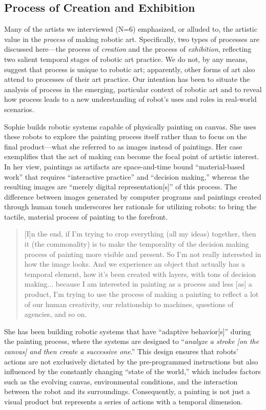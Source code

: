 \subsection{Process of Creation and Exhibition}

Many of the artists we interviewed (N=6) emphasized, or alluded to, the artistic value in the \textit{process} of making robotic art. Specifically, two types of processes are discussed here---the process of \textit{creation} and the process of \textit{exhibition}, reflecting two salient temporal stages of robotic art practice. We do not, by any means, suggest that process is unique to robotic art; apparently, other forms of art also attend to processes of their art practice. Our intention has been to situate the analysis of process in the emerging, particular context of robotic art and to reveal how process leads to a new understanding of robot's uses and roles in real-world scenarios.

Sophie builds robotic systems capable of physically painting on canvas. She uses these robots to explore the painting process itself rather than to focus on the final product—what she referred to as images instead of paintings. Her case exemplifies that the act of making can become the focal point of artistic interest. In her view, paintings as artifacts are space-and-time bound ``material-based work'' that requires ``interactive practice'' and ``decision making,'' whereas the resulting images are ``merely digital representation[s]'' of this process. The difference between images generated by computer programs and paintings created through human touch underscores her rationale for utilizing robots: to bring the tactile, material process of painting to the forefront.

\begin{quote}
   [I]n the end, if I'm trying to crop everything (all my ideas) together, then it (the commonality) is to make the temporality of the decision making process of painting more visible and present. So I'm not really interested in how the image looks. And we experience an object that actually has a temporal element, how it's been created with layers, with tons of decision making... because I am interested in painting as a process and less [as] a product, I'm trying to use the process of making a painting to reflect a lot of our human creativity, our relationship to machines, questions of agencies, and so on.
\end{quote}

She has been building robotic systems that have ``adaptive behavior[s]'' during the painting process, where the systems are designed to ``\textit{analyze a stroke [on the canvas] and then create a successive one}.'' This design ensures that robots' actions are not exclusively dictated by the pre-programmed instructions but also influenced by the constantly changing ``state of the world,'' which includes factors such as the evolving canvas, environmental conditions, and the interaction between the robot and its surroundings. Consequently, a painting is not just a visual product but represents a series of actions with a temporal dimension.

